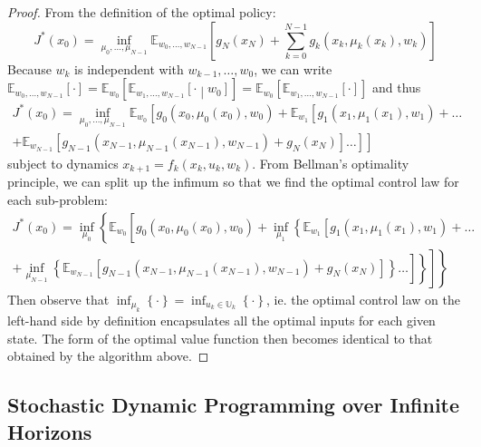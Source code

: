 \documentclass[11pt]{report} %
\begin{document}
\begin{proof}
From the definition of the optimal policy:
\begin{equation}
J^{*}\left(x_{0}\right) = \inf_{\mu_{0}, \dots, \mu_{N - 1}}\mathbb{E}_{w_{0}, \dots, w_{N - 1}}\left[g_{N}\left(x_{N}\right)+\sum_{k=0}^{N-1}g_{k}\left(x_{k},\mu_{k}\left(x_{k}\right),w_{k}\right)\right]
\end{equation}
Because $w_{k}$ is independent with $w_{k - 1}, \dots, w_{0}$, we can write $\mathbb{E}_{w_{0}, \dots, w_{N - 1}}\left[\cdot\right] = \mathbb{E}_{w_{0}}\left[\mathbb{E}_{w_{1}, \dots, w_{N - 1}}\left[\cdot\middle|w_{0}\right]\right] = \mathbb{E}_{w_{0}}\left[\mathbb{E}_{w_{1}, \dots, w_{N - 1}}\left[\cdot\right]\right]$ and thus
\begin{multline}
J^{*}\left(x_{0}\right) = \inf_{\mu_{0},\dots,\mu_{N-1}}\mathbb{E}_{w_{0}}\left[g_{0}\left(x_{0},\mu_{0}\left(x_{0}\right),w_{0}\right)+\mathbb{E}_{w_{1}}\left[g_{1}\left(x_{1},\mu_{1}\left(x_{1}\right),w_{1}\right)+ \right.\right. \dots \\
\left.\left. +\mathbb{E}_{w_{N-1}}\left[g_{N-1}\left(x_{N-1},\mu_{N-1}\left(x_{N-1}\right),w_{N-1}\right)+g_{N}\left(x_{N}\right)\right]\dots\right]\right]
\end{multline}
subject to dynamics $x_{k + 1} = f_{k}\left(x_{k}, u_{k}, w_{k}\right)$. From Bellman's optimality principle, we can split up the infimum so that we find the optimal control law for each sub-problem:
\begin{multline}
J^{*}\left(x_{0}\right) = \inf_{\mu_{0}}\left\{ \mathbb{E}_{w_{0}}\left[g_{0}\left(x_{0},\mu_{0}\left(x_{0}\right),w_{0}\right)+\inf_{\mu_{1}}\left\{ \mathbb{E}_{w_{1}}\left[g_{1}\left(x_{1},\mu_{1}\left(x_{1}\right),w_{1}\right)+\dots\right.\right.\right.\right. \\
\left.\left.\left.\left. +\inf_{\mu_{N-1}}\left\{ \mathbb{E}_{w_{N-1}}\left[g_{N-1}\left(x_{N-1},\mu_{N-1}\left(x_{N-1}\right),w_{N-1}\right)+g_{N}\left(x_{N}\right)\right]\right\} \dots\right]\right\}\right] \right\} 
\end{multline}
Then observe that $\inf_{\mu_{k}}\left\{\cdot\right\} = \inf_{u_{k} \in \mathbb{U}_{k}}\left\{\cdot\right\}$, ie. the optimal control law on the left-hand side by definition encapsulates all the optimal inputs for each given state. The form of the optimal value function then becomes identical to that obtained by the algorithm above.
\end{proof}

\subsection{Stochastic Dynamic Programming over Infinite Horizons}
\end{document}
